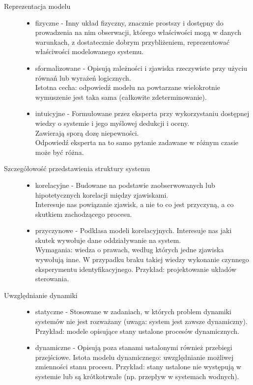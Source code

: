 \begin{description}
    \item[Reprezentacja modelu]\mbox{}
    \begin{itemize}
        \item fizyczne - Inny układ fizyczny, znacznie prostszy i dostępny do prowadzenia na nim obserwacji, którego właściwości mogą w danych warunkach, z dostatecznie dobrym przybliżeniem, reprezentować właściwości modelowanego systemu.
        \item sformalizowane - Opisują zależności i zjawiska rzeczywiste przy użyciu równań lub wyrażeń logicznych.\\
        Istotna cecha: odpowiedź modelu na powtarzane wielokrotnie wymuszenie jest taka sama (całkowite zdeterminowanie).
        \item intuicyjne - Formułowane przez eksperta przy wykorzystaniu dostępnej wiedzy o systemie i jego myślowej dedukcji i oceny.\\
        Zawierają sporą dozę niepewności.\\
        Odpowiedź eksperta na to samo pytanie zadawane w różnym czasie może być różna.
    \end{itemize}
    \item[Szczegółowość przedstawienia struktury systemu]\mbox{}
    \begin{itemize}
        \item korelacyjne - Budowane na podstawie zaobserwowanych lub hipotetycznych korelacji między zjawiskami.\\
        Interesuje nas powiązanie zjawisk, a nie to co jest przyczyną, a co skutkiem zachodzącego procesu.
        \item przyczynowe - Podklasa modeli korelacyjnych. Interesuje nas jaki skutek wywołuje dane oddziaływanie na system.\\
        Wymagania: wiedza o prawach, według których jedne zjawiska wywołują inne. W przypadku braku takiej wiedzy wykonanie czynnego eksperymentu identyfikacyjnego. Przykład: projektowanie układów sterowania.
    \end{itemize}
    \item[Uwzględnianie dynamiki]\mbox{}
    \begin{itemize}
        \item statyczne - Stosowane w zadaniach, w których problem dynamiki systemów nie jest rozważany (uwaga: system jest zawsze dynamiczny). Przykład: modele opisujące stany ustalone procesów dynamicznych.
        \item dynamiczne - Opisują poza stanami ustalonymi również przebiegi przejściowe. Istota modelu dynamicznego: uwzględnianie możliwej zmienności stanu procesu. Przykład: stany ustalone nie występują w systemie lub są krótkotrwałe (np. przepływ w systemach wodnych).

\end{itemize}
\end{description}
